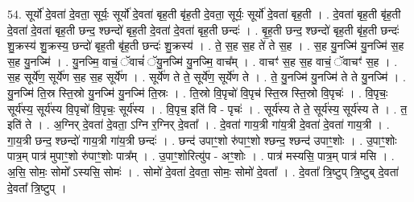 \documentclass[17pt]{extarticle}
\begin{document}
54. सूर्यो॑ दे॒वता॑ दे॒वता॒ सूर्यः॒ सूर्यो॑ दे॒वता॑ बृह॒ती बृ॑ह॒ती दे॒वता॒ सूर्यः॒ सूर्यो॑ दे॒वता॑ बृह॒ती । . दे॒वता॑ बृह॒ती बृ॑ह॒ती दे॒वता॑ दे॒वता॑ बृह॒ती छन्द॒ श्छन्दो॑ बृह॒ती दे॒वता॑ दे॒वता॑ बृह॒ती छन्दः॑ । . बृ॒ह॒ती छन्द॒ श्छन्दो॑ बृह॒ती बृ॑ह॒ती छन्दः॑ शु॒क्रस्य॑ शु॒क्रस्य॒ छन्दो॑ बृह॒ती बृ॑ह॒ती छन्दः॑ शु॒क्रस्य॑ । . ते॒ स॒ह स॒ह ते॑ ते स॒ह । . स॒ह यु॒नज्मि॑ यु॒नज्मि॑ स॒ह स॒ह यु॒नज्मि॑ । . यु॒नज्मि॒ वाचं॒ ॅवाचं॑ ॅयु॒नज्मि॑ यु॒नज्मि॒ वाच᳚म् । . वाचꣳ॑ स॒ह स॒ह वाचं॒ ॅवाचꣳ॑ स॒ह । . स॒ह सूर्ये॑ण॒ सूर्ये॑ण स॒ह स॒ह सूर्ये॑ण । . सूर्ये॑ण ते ते॒ सूर्ये॑ण॒ सूर्ये॑ण ते । . ते॒ यु॒नज्मि॑ यु॒नज्मि॑ ते ते यु॒नज्मि॑ । . यु॒नज्मि॑ ति॒स्र स्ति॒स्रो यु॒नज्मि॑ यु॒नज्मि॑ ति॒स्रः । . ति॒स्रो वि॒पृचो॑ वि॒पृच॑ स्ति॒स्र स्ति॒स्रो वि॒पृचः॑ । . वि॒पृचः॒ सूर्य॑स्य॒ सूर्य॑स्य वि॒पृचो॑ वि॒पृचः॒ सूर्य॑स्य । . वि॒पृच॒ इति॑ वि - पृचः॑ । . सूर्य॑स्य ते ते॒ सूर्य॑स्य॒ सूर्य॑स्य ते । . त॒ इति॑ ते । . अ॒ग्निर् दे॒वता॑ दे॒वता॒ ऽग्नि र॒ग्निर् दे॒वता᳚ । . दे॒वता॑ गाय॒त्री गा॑य॒त्री दे॒वता॑ दे॒वता॑ गाय॒त्री । . गा॒य॒त्री छन्द॒ श्छन्दो॑ गाय॒त्री गा॑य॒त्री छन्दः॑ । . छन्द॑ उपाꣳ॒॒शो रु॑पाꣳ॒॒शो श्छन्द॒ श्छन्द॑ उपाꣳ॒॒शोः । . उ॒पाꣳ॒॒शोः पात्र॒म् पात्र॑ मुपाꣳ॒॒शो रु॑पाꣳ॒॒शोः पात्र᳚म् । . उ॒पाꣳ॒॒शोरित्यु॑प - अꣳ॒॒शोः । . पात्र॑ मस्यसि॒ पात्र॒म् पात्र॑ मसि । . अ॒सि॒ सोमः॒ सोमो᳚ ऽस्यसि॒ सोमः॑ । . सोमो॑ दे॒वता॑ दे॒वता॒ सोमः॒ सोमो॑ दे॒वता᳚ । . दे॒वता᳚ त्रि॒ष्टुप् त्रि॒ष्टुब् दे॒वता॑ दे॒वता᳚ त्रि॒ष्टुप् । \newline
\end{document}
